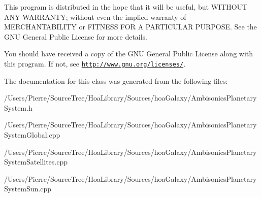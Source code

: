 This program is distributed in the hope that it will be useful, but W\-I\-T\-H\-O\-U\-T A\-N\-Y W\-A\-R\-R\-A\-N\-T\-Y; without even the implied warranty of M\-E\-R\-C\-H\-A\-N\-T\-A\-B\-I\-L\-I\-T\-Y or F\-I\-T\-N\-E\-S\-S F\-O\-R A P\-A\-R\-T\-I\-C\-U\-L\-A\-R P\-U\-R\-P\-O\-S\-E. See the G\-N\-U General Public License for more details.

You should have received a copy of the G\-N\-U General Public License along with this program. If not, see \href{http://www.gnu.org/licenses/}{\tt http\-://www.\-gnu.\-org/licenses/}. 

The documentation for this class was generated from the following files\-:\begin{DoxyCompactItemize}
\item 
/\-Users/\-Pierre/\-Source\-Tree/\-Hoa\-Library/\-Sources/hoa\-Galaxy/Ambisonics\-Planetary\-System.\-h\item 
/\-Users/\-Pierre/\-Source\-Tree/\-Hoa\-Library/\-Sources/hoa\-Galaxy/Ambisonics\-Planetary\-System\-Global.\-cpp\item 
/\-Users/\-Pierre/\-Source\-Tree/\-Hoa\-Library/\-Sources/hoa\-Galaxy/Ambisonics\-Planetary\-System\-Satellites.\-cpp\item 
/\-Users/\-Pierre/\-Source\-Tree/\-Hoa\-Library/\-Sources/hoa\-Galaxy/Ambisonics\-Planetary\-System\-Sun.\-cpp\end{DoxyCompactItemize}
